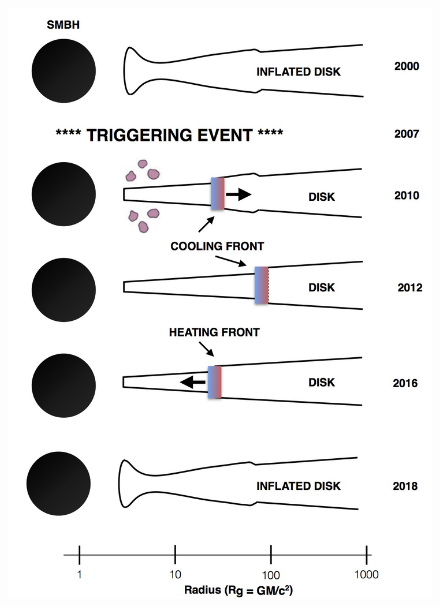 \documentclass{nature}
\begin{document}
\begin{figure}
  \includegraphics[width=15.4cm, height=18.75cm, trim=0.0cm 0.0cm 0.0cm 0.0cm, clip]
  {../plots/models/cartoon_v3pnt1.jpg}
  \centering
  \caption[]{
}
\end{figure}
\end{document}
